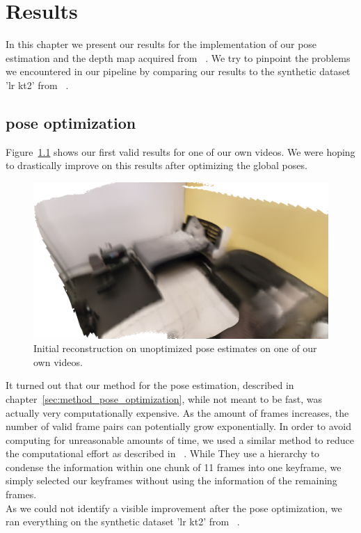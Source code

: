 \chapter{Results}
    In this chapter we present our results for the implementation of our pose estimation and the depth map acquired from ~\cite{luo2020consistent}.
    We try to pinpoint the problems we encountered in our pipeline by comparing our results to the synthetic dataset 'lr kt2' from ~\cite{handa:etal:ICRA2014}.
    \section{pose optimization}
        Figure~\ref{fig:initial_reconstruction} shows our first valid results for one of our own videos.
        We were hoping to drastically improve on this results after optimizing the global poses.
        \begin{figure}[ht]
            \centering
            \includegraphics[width=.6\textwidth]{images/initial_reconstruction.png}
            \caption{Initial reconstruction on unoptimized pose estimates on one of our own videos.}
            \label{fig:initial_reconstruction}
        \end{figure}
        It turned out that our method for the pose estimation, described in chapter~\ref{sec:method_pose_optimization}, while not meant to be fast, was actually very computationally expensive.
        As the amount of frames increases, the number of valid frame pairs can potentially grow exponentially.
        In order to avoid computing for unreasonable amounts of time, we used a similar method to reduce the computational effort as described in ~\cite{dai2017bundlefusion}.
        While They use a hierarchy to condense the information within one chunk of 11 frames into one keyframe, we simply selected our keyframes without using the information of the remaining frames.\\
        As we could not identify a visible improvement after the pose optimization, we ran everything on the synthetic dataset 'lr kt2' from ~\cite{handa:etal:ICRA2014}.
